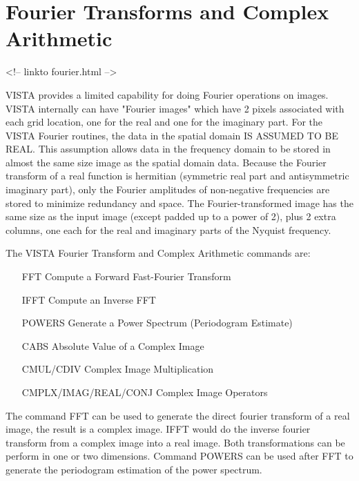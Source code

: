\chapter{Fourier Transforms and Complex Arithmetic}
\begin{rawhtml}
<!-- linkto fourier.html -->
\end{rawhtml}

%
%

VISTA provides a limited capability for doing Fourier operations on images.
VISTA internally can have "Fourier images" which have 2 pixels associated
with each grid location, one for the real and one for the imaginary
part. For the VISTA Fourier routines, the data in the spatial domain IS
ASSUMED TO BE REAL. This assumption allows data in the frequency domain to
be stored in almost the same size image as the spatial domain data. Because
the Fourier transform of a real function is hermitian (symmetric real part
and antisymmetric imaginary part), only the Fourier amplitudes of
non-negative frequencies are stored to minimize redundancy and space.  The
Fourier-transformed image has the same size as the input image (except
padded up to a power of 2), plus 2 extra columns, one each for the real and
imaginary parts of the Nyquist frequency.

The VISTA Fourier Transform and Complex Arithmetic commands are:
\begin{itemize}
  \item[FFT]{Compute a Forward Fast-Fourier Transform}
  \item[IFFT]{Compute an Inverse FFT}
  \item[POWERS]{Generate a Power Spectrum (Periodogram Estimate)}
  \item[CABS]{Absolute Value of a Complex Image}
  \item[CMUL/CDIV]{Complex Image Multiplication}
  \item[CMPLX/IMAG/REAL/CONJ]{Complex Image Operators}
\end{itemize}

The command FFT can be used to generate the direct fourier transform of a
real image, the result is a complex image. IFFT would do the inverse
fourier transform from a complex image into a real image. Both
transformations can be perform in one or two dimensions. Command POWERS can
be used after FFT to generate the periodogram estimation of the power
spectrum.  

